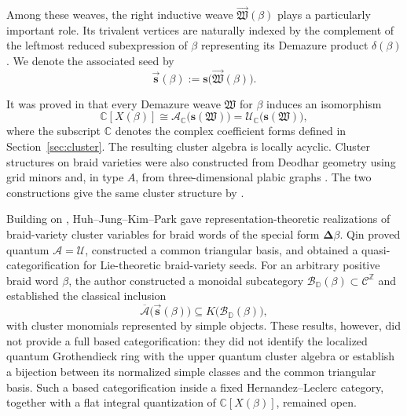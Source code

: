 \documentclass[12pt, reqno]{amsart}
\theoremstyle{plain}
\theoremstyle{definition}
\numberwithin{equation}{section}
\newcommand{\ZZ}{\mathbb{Z}}
\newcommand{\CC}{\mathbb{C}}
\newcommand{\DD}{\mathbb{D}}
\begin{document}
Among these weaves, the right inductive weave
\(\overrightarrow{\mathfrak W}(\beta)\) plays a particularly
important role. Its trivalent vertices are naturally indexed by the
complement of the leftmost reduced subexpression of \(\beta\)
representing its Demazure product \(\delta(\beta)\). We denote the
associated seed by
\[
    \overrightarrow{\mathbf s}(\beta)
    :=
    \mathbf s\bigl(
        \overrightarrow{\mathfrak W}(\beta)
    \bigr).
\]

It was proved in \cite{casals2025cluster} that every Demazure weave
\(\mathfrak W\) for \(\beta\) induces an isomorphism
\begin{equation}\label{eq:intro-classical-cluster}
    \CC[X(\beta)]
    \cong
    \mathcal A_{\CC}\bigl(\mathbf s(\mathfrak W)\bigr)
    =
    \mathcal U_{\CC}\bigl(\mathbf s(\mathfrak W)\bigr),
\end{equation}
where the subscript \(\CC\) denotes the complex coefficient forms
defined in Section~\ref{sec:cluster}. The resulting cluster algebra
is locally acyclic.
Cluster structures on braid varieties were also constructed from
Deodhar geometry using grid minors and, in type \(A\), from
three-dimensional plabic graphs
\cite{galashin2022braidI,galashin2026braidII}.
The two constructions give the same cluster structure by
\cite{casals2025comparing}.

Building on \cite{kashiwara2025monoidal},
Huh--Jung--Kim--Park \cite{huh2026comparison} gave
representation-theoretic realizations of braid-variety cluster
variables for braid words of the special form
\(\boldsymbol{\Delta}\beta\). Qin \cite{qin2024analogs} proved quantum
\(\mathcal A=\mathcal U\), constructed a common triangular basis, and
obtained a quasi-categorification for Lie-theoretic braid-variety
seeds. 
For an arbitrary positive braid word \(\beta\), the author
\cite[Theorem~6.8]{bi2026towards} constructed a monoidal subcategory
\(\mathscr B_{\DD}(\beta)\subset\mathscr C^{\ZZ}\) and established
the classical inclusion
\[
    \overline{\mathcal A}\bigl(
        \overrightarrow{\mathbf s}(\beta)
    \bigr)
    \subseteq
    K\bigl(\mathscr B_{\DD}(\beta)\bigr),
\]
with cluster monomials represented by simple objects. These results, however, did not
provide a full based categorification: they did not identify the
localized quantum Grothendieck ring with the upper quantum cluster
algebra or establish a bijection between its normalized simple classes
and the common triangular basis. Such a based categorification inside
a fixed Hernandez--Leclerc category, together with a flat integral
quantization of \(\CC[X(\beta)]\), remained open.
\end{document}
